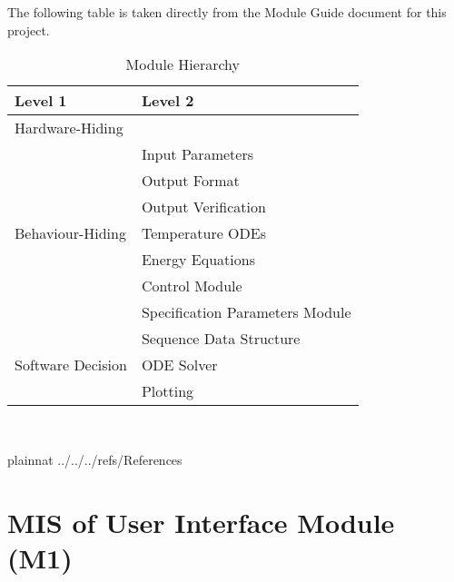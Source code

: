 \documentclass[12pt, titlepage]{article}
\begin{document}
The following table is taken directly from the Module Guide document for this project.

\begin{table}[h!]
  \centering
  \begin{tabular}{p{} p{}}
    \toprule
    \textbf{Level 1}                               & \textbf{Level 2}                \\
    \midrule

    {Hardware-Hiding}                              & ~                               \\
    \midrule

    \multirow{7}{0.3\textwidth}{Behaviour-Hiding}  & Input Parameters                \\
                                                   & Output Format                   \\
                                                   & Output Verification             \\
                                                   & Temperature ODEs                \\
                                                   & Energy Equations                \\
                                                   & Control Module                  \\
                                                   & Specification Parameters Module \\
    \midrule

    \multirow{3}{0.3\textwidth}{Software Decision} & {Sequence Data Structure}       \\
                                                   & ODE Solver                      \\
                                                   & Plotting                        \\
    \bottomrule
  \end{tabular}
  \caption{Module Hierarchy}
  \label{TblMH}
\end{table}

\newpage
~\newpage

\newpage

 {plainnat}
 {../../../refs/References}

\newpage

\section{MIS of User Interface Module (M1)} \label{Module:UI}
\end{document}
